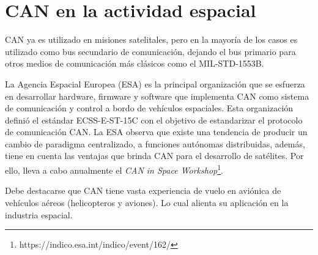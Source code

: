 \section{CAN en la actividad espacial}\label{sec:CAN_space}
CAN ya es utilizado en misiones satelitales, pero en la mayoría de los
casos es utilizado como bus secundario de comunicación, dejando el bus
primario para otros medios de comunicación más clásicos como el
MIL-STD-1553B.

La Agencia Espacial Europea (ESA) es la principal organización que se
esfuerza en desarrollar hardware, firmware y software que implementa
CAN como sistema de comunicación y control a bordo de vehículos espaciales.
Esta organización definió el estándar ECSS-E-ST-15C con el objetivo de
estandarizar el protocolo de comunicación CAN. La ESA observa que existe
una tendencia de producir un cambio de  paradigma 
centralizado, a funciones autónomas distribuidas, además, tiene en cuenta las ventajas que
brinda CAN para el desarrollo de satélites. Por ello, lleva a cabo anualmente
el \textit{CAN in Space Workshop}\footnote{https://indico.esa.int/indico/event/162/}.

Debe destacarse que CAN tiene vasta experiencia de vuelo en aviónica de
vehículos aéreos (helicopteros y aviones). Lo cual alienta su aplicación
en la industria espacial.
